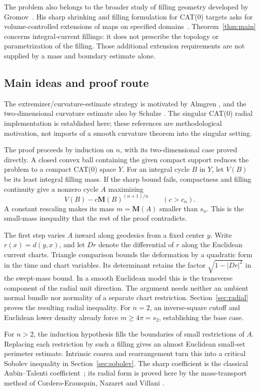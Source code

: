 \documentclass[11pt]{article}
\numberwithin{equation}{section}
\theoremstyle{definition}
\theoremstyle{remark}
\begin{document}
The problem also belongs to the broader study of filling geometry
developed by Gromov~\cite{Gromov1983}. His sharp shrinking and filling
formulation for CAT(0) targets asks for volume-controlled extensions of
maps on specified domains~\cite[Section~2.3]{Gromov2014}.
Theorem~\ref{thm:main} concerns integral-current fillings: it does not
prescribe the topology or parametrization of the filling. Those
additional extension requirements are not supplied by a mass and
boundary estimate alone.

\subsection{Main ideas and proof route}

The extremizer/curvature-estimate strategy is motivated by Almgren
\cite[Section~0, p.~454]{Almgren1986}, and the two-dimensional
curvature estimate also by Schulze \cite[Theorem~1.4]{Schulze2020}.
The singular CAT(0) radial implementation is established here; these
references are methodological motivation, not imports of a smooth
curvature theorem into the singular setting.

The proof proceeds by induction on $n$, with its two-dimensional case
proved directly. A closed convex ball containing the given compact
support reduces the problem to a compact CAT(0) space $Y$. For an
integral cycle $B$ in $Y$, let $V(B)$ be its least integral filling mass.
If the sharp bound fails, compactness and filling continuity give a
nonzero cycle $A$ maximizing
\[
 V(B)-c\mathbf M(B)^{(n+1)/n}\qquad(c>c_n).
\]
A constant rescaling makes its mass $m=\mathbf M(A)$ smaller than $s_n$.
This is the small-mass inequality that the rest of the proof contradicts.

The first step varies $A$ inward along geodesics from a fixed center
$y$. Write $r(x)=d(y,x)$, and let $Dr$ denote the differential of $r$
along the Euclidean current charts. Triangle comparison bounds the
deformation by a quadratic form in the time and chart variables.
Its determinant retains the factor $\sqrt{1-|Dr|^2}$ in the swept-mass
bound. In a smooth Euclidean model this is the transverse component of
the radial unit direction. The argument needs neither an ambient
normal bundle nor normality of a separate chart restriction.
Section~\ref{sec:radial} proves the resulting radial inequality.
For $n=2$, an inverse-square cutoff and Euclidean lower density
already force $m\ge4\pi=s_2$, establishing the base case.

For $n>2$, the induction hypothesis fills the boundaries of small
restrictions of $A$. Replacing each restriction by such a filling
gives an almost Euclidean small-set perimeter estimate. Intrinsic
coarea and rearrangement turn this into a critical Sobolev inequality
in Section~\ref{sec:sobolev}. The sharp coefficient is the classical
Aubin--Talenti coefficient~\cite{Aubin1976,Talenti1976}; its radial
form is proved here by the mass-transport method of
Cordero-Erausquin, Nazaret and Villani
\cite[Section~2]{CorderoNazaretVillani2004}.
\end{document}
